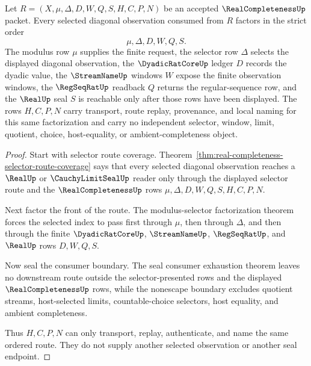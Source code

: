 \begin{theorem}
\label{thm:real-completeness-selector-window-seal-factorization}
Let $R=(X,\mu,\Delta,D,W,Q,S,H,C,P,N)$ be an accepted $\RealCompletenessUp$ packet. Every selected diagonal observation consumed from $R$ factors in the strict order
$$
\mu,\Delta,D,W,Q,S.
$$
The modulus row $\mu$ supplies the finite request, the selector row $\Delta$ selects the displayed diagonal observation, the $\DyadicRatCoreUp$ ledger $D$ records the dyadic value, the $\StreamNameUp$ windows $W$ expose the finite observation windows, the $\RegSeqRatUp$ readback $Q$ returns the regular-sequence row, and the $\RealUp$ seal $S$ is reachable only after those rows have been displayed. The rows $H,C,P,N$ carry transport, route replay, provenance, and local naming for this same factorization and carry no independent selector, window, limit, quotient, choice, host-equality, or ambient-completeness object.
\end{theorem}
\begin{proof}
Start with selector route coverage. Theorem~\ref{thm:real-completeness-selector-route-coverage} says that every selected diagonal observation reaches a $\RealUp$ or $\CauchyLimitSealUp$ reader only through the displayed selector route and the $\RealCompletenessUp$ rows $\mu,\Delta,D,W,Q,S,H,C,P,N$.

Next factor the front of the route. The modulus-selector factorization theorem forces the selected index to pass first through $\mu$, then through $\Delta$, and then through the finite $\DyadicRatCoreUp$, $\StreamNameUp$, $\RegSeqRatUp$, and $\RealUp$ rows $D,W,Q,S$.

Now seal the consumer boundary. The seal consumer exhaustion theorem leaves no downstream route outside the selector-presented rows and the displayed $\RealCompletenessUp$ rows, while the nonescape boundary excludes quotient streams, host-selected limits, countable-choice selectors, host equality, and ambient completeness.

Thus $H,C,P,N$ can only transport, replay, authenticate, and name the same ordered route. They do not supply another selected observation or another seal endpoint.
\end{proof}

